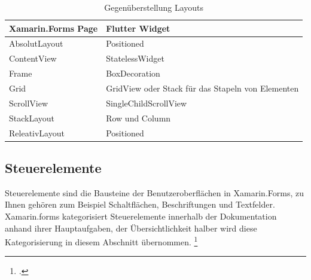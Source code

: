 \begin{table}[!ht]
\begin{tabularx}{\textwidth}{X|X}
   \textbf{Xamarin.Forms Page} & \textbf{Flutter Widget}  \\
\hline
	AbsolutLayout       		&  Positioned	 			\\ 
	ContentView       		&  StatelessWidget	 			\\ 
	Frame       					&  BoxDecoration     	 			\\ 
	Grid            				&  GridView oder Stack für das Stapeln von Elementen						\\ 
	ScrollView            		&  SingleChildScrollView		\\ 
	StackLayout       		&  Row und Column  	 			\\ 
	ReleativLayout           &  Positioned		\\ 

\end{tabularx}
\caption{Gegenüberstellung Layouts}
 \label{tab:XamLayouts}
\end{table}

\subsection{Steuerelemente}

Steuerelemente sind die Bausteine der Benutzeroberflächen in Xamarin.Forms, zu Ihnen gehören zum Beispiel Schaltflächen, Beschriftungen und Textfelder.  Xamarin.forms kategorisiert Steuerelemente innerhalb der Dokumentation anhand ihrer Hauptaufgaben,  der Übersichtlichkeit halber wird diese Kategorisierung in diesem Abschnitt übernommen.  \footcite[Vgl.][Abgerufen am \today]{MicrosoftXamViews2020}

